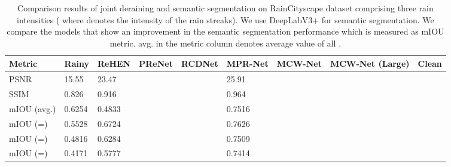 \documentclass[a4paper,fleqn]{cas-dc}
\begin{document}
\begin{table*}[]
	\centering
	\caption{ Comparison results of joint deraining and semantic segmentation on RainCityscape dataset comprising three rain intensities ( where  denotes the intensity of the rain streaks). We use DeepLabV3+ \cite{chen2018encoder} for semantic segmentation. We compare the models that show an improvement in the semantic segmentation performance which is measured as mIOU metric. avg. in the metric column denotes average value of all .
	}
	\begin{tabular*}{\tblwidth}{@{}LLLLLLLLL@{}}
		\toprule
		Metric  &  Rainy   &   ReHEN    & PReNet                      & RCDNet      &  MPR-Net &  MCW-Net  &  MCW-Net (Large) &  Clean   \\ \midrule


		PSNR                   &  15.55  & 23.47 &                            &        &25.91           &     &   &     \\ 
		SSIM                   &  0.826  & 0.916 &                            &           &   0.964          &     &     &     \\ 


		mIOU (avg.)                &  0.6254 & 0.4833 &                          &                     &  0.7516       &     &      & \\ 
		mIOU (=)                  & 0.5528 &  0.6724  &                          &          & 0.7626              &     &      &  \\ 
		mIOU (=)                  & 0.4816 &  0.6284  &                          &          & 0.7509            &      &    &  \\ 
		mIOU (=)                  & 0.4171 &  0.5777  &                          &          & 0.7414            &     &       &  \\   \bottomrule
		
\end{tabular*}
\label{table:cityscape}

\end{table*}
\end{document}
